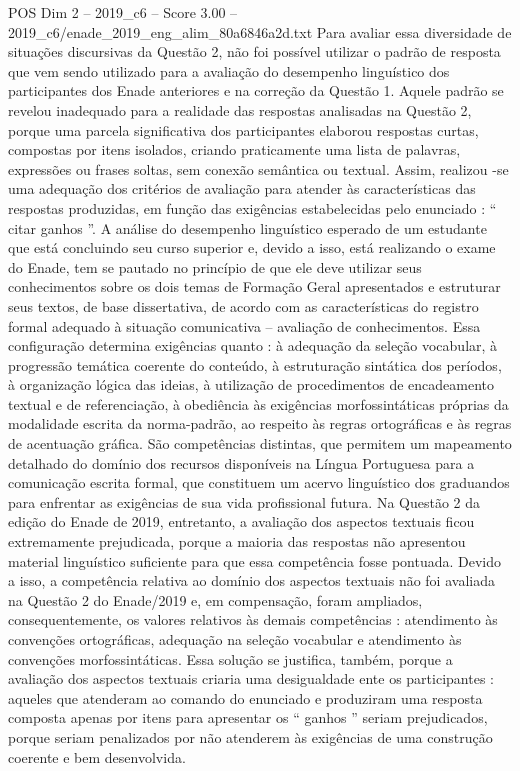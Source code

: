 \begin{textsample}{POS Dim 2 – 2019\_c6 – Score 3.00 – 2019\_c6/enade\_2019\_eng\_alim\_80a6846a2d.txt}
Para avaliar essa diversidade de situações discursivas da Questão 2, não foi possível utilizar o padrão de resposta que vem sendo utilizado para a avaliação do desempenho linguístico dos participantes dos Enade anteriores e na correção da Questão 1.
Aquele padrão se revelou inadequado para a realidade das respostas analisadas na Questão 2, porque uma parcela significativa dos participantes elaborou respostas curtas, compostas por itens isolados, criando praticamente uma lista de palavras, expressões ou frases soltas, sem conexão semântica ou textual.
Assim, realizou -se uma adequação dos critérios de avaliação para atender às características das respostas produzidas, em função das exigências estabelecidas pelo enunciado : “ citar ganhos ”.
A análise do desempenho linguístico esperado de um estudante que está concluindo seu curso superior e, devido a isso, está realizando o exame do Enade, tem se pautado no princípio de que ele deve utilizar seus conhecimentos sobre os dois temas de Formação Geral apresentados e estruturar seus textos, de base dissertativa, de acordo com as características do registro formal adequado à situação comunicativa – avaliação de conhecimentos.
Essa configuração determina exigências quanto : à adequação da seleção vocabular, à progressão temática coerente do conteúdo, à estruturação sintática dos períodos, à organização lógica das ideias, à utilização de procedimentos de encadeamento textual e de referenciação, à obediência às exigências morfossintáticas próprias da modalidade escrita da norma-padrão, ao respeito às regras ortográficas e às regras de acentuação gráfica.
São competências distintas, que permitem um mapeamento detalhado do domínio dos recursos disponíveis na Língua Portuguesa para a comunicação escrita formal, que constituem um acervo linguístico dos graduandos para enfrentar as exigências de sua vida profissional futura.
Na Questão 2 da edição do Enade de 2019, entretanto, a avaliação dos aspectos textuais ficou extremamente prejudicada, porque a maioria das respostas não apresentou material linguístico suficiente para que essa competência fosse pontuada.
Devido a isso, a competência relativa ao domínio dos aspectos textuais não foi avaliada na Questão 2 do Enade/2019 e, em compensação, foram ampliados, consequentemente, os valores relativos às demais competências : atendimento às convenções ortográficas, adequação na seleção vocabular e atendimento às convenções morfossintáticas.
Essa solução se justifica, também, porque a avaliação dos aspectos textuais criaria uma desigualdade ente os participantes : aqueles que atenderam ao comando do enunciado e produziram uma resposta composta apenas por itens para apresentar os “ ganhos ” seriam prejudicados, porque seriam penalizados por não atenderem às exigências de uma construção coerente e bem desenvolvida.

\end{textsample}
